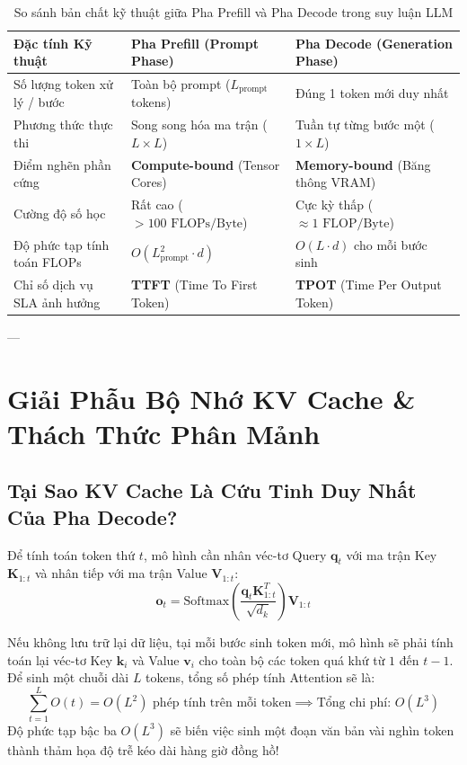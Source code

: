\begin{table}[htbp]
\centering
\small
\caption{So sánh bản chất kỹ thuật giữa Pha Prefill và Pha Decode trong suy luận LLM}
\label{tab:prefill-vs-decode}
\begin{tabular}{lll}
\toprule
\textbf{Đặc tính Kỹ thuật} & \textbf{Pha Prefill (Prompt Phase)} & \textbf{Pha Decode (Generation Phase)} \\
\midrule
Số lượng token xử lý / bước & Toàn bộ prompt ($L_{\text{prompt}}$ tokens) & Đúng 1 token mới duy nhất \\
Phương thức thực thi & Song song hóa ma trận ($L \times L$) & Tuần tự từng bước một ($1 \times L$) \\
Điểm nghẽn phần cứng & \textbf{Compute-bound} (Tensor Cores) & \textbf{Memory-bound} (Băng thông VRAM) \\
Cường độ số học & Rất cao ($>100\text{ FLOPs/Byte}$) & Cực kỳ thấp ($\approx 1\text{ FLOP/Byte}$) \\
Độ phức tạp tính toán FLOPs & $O(L_{\text{prompt}}^2 \cdot d)$ & $O(L \cdot d)$ cho mỗi bước sinh \\
Chỉ số dịch vụ SLA ảnh hưởng & \textbf{TTFT} (Time To First Token) & \textbf{TPOT} (Time Per Output Token) \\
\bottomrule
\end{tabular}
\end{table}

---

\section{Giải Phẫu Bộ Nhớ KV Cache \& Thách Thức Phân Mảnh}
\label{sec:kv-cache-anatomy}

\subsection{Tại Sao KV Cache Là Cứu Tinh Duy Nhất Của Pha Decode?}
Để tính toán token thứ $t$, mô hình cần nhân véc-tơ Query $\mathbf{q}_t$ với ma trận Key $\mathbf{K}_{1:t}$ và nhân tiếp với ma trận Value $\mathbf{V}_{1:t}$:
\begin{equation}
\mathbf{o}_t = \text{Softmax}\left(\frac{\mathbf{q}_t \mathbf{K}_{1:t}^T}{\sqrt{d_k}}\right) \mathbf{V}_{1:t}
\end{equation}

Nếu không lưu trữ lại dữ liệu, tại mỗi bước sinh token mới, mô hình sẽ phải tính toán lại véc-tơ Key $\mathbf{k}_i$ và Value $\mathbf{v}_i$ cho toàn bộ các token quá khứ từ $1$ đến $t-1$.
Để sinh một chuỗi dài $L$ tokens, tổng số phép tính Attention sẽ là:
\begin{equation}
\sum_{t=1}^L O(t) = O(L^2) \text{ phép tính trên mỗi token} \implies \text{Tổng chi phí: } O(L^3)
\end{equation}
Độ phức tạp bậc ba $O(L^3)$ sẽ biến việc sinh một đoạn văn bản vài nghìn token thành thảm họa độ trễ kéo dài hàng giờ đồng hồ!

